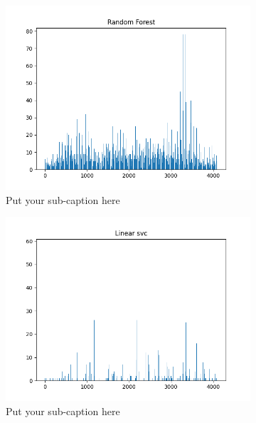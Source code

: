 \documentclass{article}
\begin{document}
\begin{figure}[H]
\begin{subfigure}{.33\textwidth}
  \centering
  \includegraphics[width=1\linewidth]{1e/Dogs 2 clusters/selection Random Forest.png}  
  \caption{Put your sub-caption here}
  \label{fig:sub-first}
\end{subfigure}
\begin{subfigure}{.33\textwidth}
  \centering
  \includegraphics[width=1\linewidth]{1e/Dogs 2 clusters/selection linear svc.png}  
  \caption{Put your sub-caption here}
  \label{svc selection}
\end{subfigure}
\begin{subfigure}{.33\textwidth}

\end{subfigure}
\end{figure}
\end{document}
